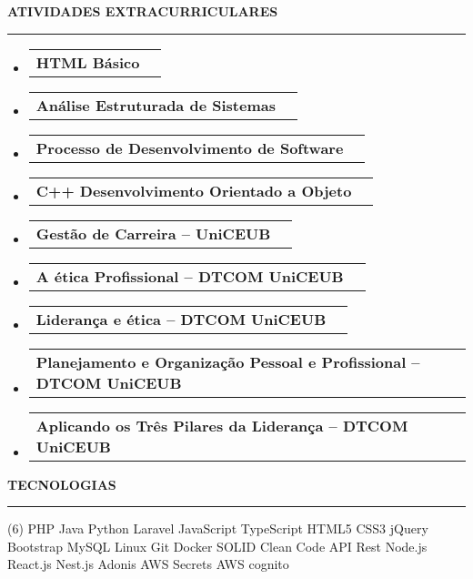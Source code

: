 \documentclass[a4paper,10pt]{article}
\makeatletter
\newcommand{\ProjectItem}[2]{
    \item
        \begin{tabular*}{0.93\textwidth}[t]{l@{\extracolsep{\fill}}r}
            \textbf{#1} & \footnotesize#2
        \end{tabular*}
}
\newcommand{\SectionTitle}[1]{
    \begin{flushleft}
    \textbf{#1}
    \noindent\textcolor{gray}{\rule{18.5cm}{1px}}
    \end{flushleft}
}
\newcommand{\SectionBegin}[0]{
    \vspace{-16pt}\begin{flushleft}
    \begin{itemize}
}
\newcommand{\SectionEnd}[0]{
    \end{itemize}
    \end{flushleft}\vspace{-2pt}
}
\makeatother
\begin{document}
\SectionTitle
    {ATIVIDADES EXTRACURRICULARES}
\SectionBegin
    \ProjectItem{HTML Básico}{}
    \ProjectItem{Análise Estruturada de Sistemas}{}
    \ProjectItem{Processo de Desenvolvimento de Software}{}
    \ProjectItem{C++ Desenvolvimento Orientado a Objeto}{}
    \ProjectItem{Gestão de Carreira – UniCEUB}{}
    \ProjectItem{A ética Profissional – DTCOM UniCEUB}{}
    \ProjectItem{Liderança e ética – DTCOM UniCEUB}{}
    \ProjectItem{Planejamento e Organização Pessoal e Profissional – DTCOM UniCEUB}{}
    \ProjectItem{Aplicando os Três Pilares da Liderança – DTCOM UniCEUB}{}
\SectionEnd
    
\SectionTitle
    {TECNOLOGIAS}
\begin{tasks}[style=itemize, column-sep=-13mm, label-align=left, label-offset={0mm}](6)%
\task PHP
\task Java
\task Python
\task Laravel
\task JavaScript
\task TypeScript
\task HTML5
\task CSS3
\task jQuery
\task Bootstrap
\task MySQL
\task Linux
\task Git
\task Docker
\task SOLID
\task Clean Code
\task API Rest
\task Node.js
\task React.js
\task Nest.js 
\task Adonis 
\task AWS Secrets
\task AWS cognito 
\end{tasks}
\end{document}

